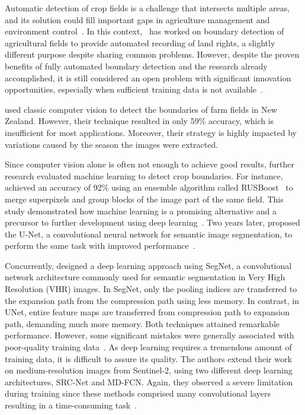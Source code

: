 \documentclass[12pt]{article}
\begin{document}
Automatic detection of crop fields is a challenge that intersects multiple areas, and its solution could fill important gaps in agriculture management and environment control~\citep{bolfe2020}. In this context,~\citet{crommelinck2019} has worked on boundary detection of agricultural fields to provide automated recording of land rights, a slightly different purpose despite sharing common problems. However, despite the proven benefits of fully automated boundary detection and the research already accomplished, it is still considered an open problem with significant innovation opportunities, especially when sufficient training data is not available~\citep{waldner2021,yang2020}.

\citet{north2019} used classic computer vision to detect the boundaries of farm fields in New Zealand. However, their technique resulted in only 59\% accuracy, which is insufficient for most applications. Moreover, their strategy is highly impacted by variations caused by the season the images were extracted.


Since computer vision alone is often not enough to achieve good results, further research evaluated machine learning to detect crop boundaries. For instance, \citet{garcia2017} achieved an accuracy of 92\% using an ensemble algorithm called RUSBoost~\citep{seiffert2010} to merge superpixels and group blocks of the image part of the same field. This study demonstrated how machine learning is a promising alternative and a precursor to further development using deep learning~\citep{garcia2017}. Two years later, \citet{garcia2019} proposed the U-Net, a convolutional neural network for semantic image segmentation, to perform the same task with improved performance~\cite{garcia2017,garcia2018,garcia2019}.

Concurrently, \citet{persello2019} designed a deep learning approach using SegNet, a convolutional network architecture commonly used for semantic segmentation in Very High Resolution (VHR) images. In SegNet, only the pooling indices are transferred to the expansion path from the compression path using less memory. In contrast, in UNet, entire feature maps are transferred from compression path to expansion path, demanding much more memory. Both techniques attained remarkable performance. However, some significant mistakes were generally associated with poor-quality training data~\citep{persello2019}. As deep learning requires a tremendous amount of training data, it is difficult to assure its quality. The authors extend their work on medium-resolution images from Sentinel-2, using two different deep learning architectures, SRC-Net and MD-FCN. Again, they observed a severe limitation during training since these methods comprised many convolutional layers resulting in a time-consuming task~\cite{persello2019,masoud2020}.
\end{document}
